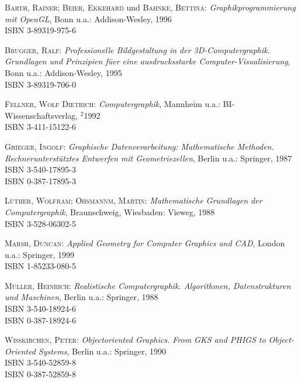 \begin{description}
  
\item \textsc{Barth, Rainer; Beier, Ekkehard} und \textsc{Bahnke,
    Bettina}: \textit{Graphikprogrammierung mit OpenGL},
  Bonn u.a.: Addison-Wesley, 1996 \\
  ISBN 3-89319-975-6
  
\item \textsc{Brugger, Ralf}: \textit{Professionelle Bildgestaltung in
    der 3D-Computergraphik.  Grundlagen und Prinzipien f\"uer eine
    ausdrucksstarke Computer-Visualisierung},
  Bonn u.a.: Addison-Wesley, 1995 \\
  ISBN 3-89319-706-0
  
\item \textsc{Fellner, Wolf Dietrich}: \textit{Computergraphik},
  Mannheim u.a.: BI-Wissenschaftsverlag, $^2$1992 \\
  ISBN 3-411-15122-6
  
\item \textsc{Grieger, Ingolf}: \textit{Graphische Datenverarbeitung:
    Mathematische Methoden. Rechnerunterst\"utztes Entwerfen mit
    Geometriezellen},
  Berlin u.a.: Springer, 1987 \\
  ISBN 3-540-17895-3 \\
  ISBN 0-387-17895-3
  
\item \textsc{Luther, Wolfram; Ohsmannm, Martin}:
  \textit{Mathematische Grundlagen der Computergraphik},
  Braunschweig, Wiesbaden: Vieweg, 1988 \\
  ISBN 3-528-06302-5
  
\item \textsc{Marsh, Duncan}: \textit{Applied Geometry for Computer
    Graphics and CAD},
  London u.a.: Springer, 1999 \\
  ISBN 1-85233-080-5
  
\item \textsc{M\"uller, Heinrich}: \textit{Realistische
    Computergraphik. Algorithmen, Datenstrukturen und Maschinen},
  Berlin u.a.: Springer, 1988 \\
  ISBN 3-540-18924-6 \\
  ISBN 0-387-18924-6
  
\item \textsc{Wisskirchen, Peter}: \textit{Objectoriented Graphics.
    From GKS and PHIGS to Object-Oriented Systems},
  Berlin u.a.: Springer, 1990 \\
  ISBN 3-540-52859-8 \\
  ISBN 0-387-52859-8

\end{description}
